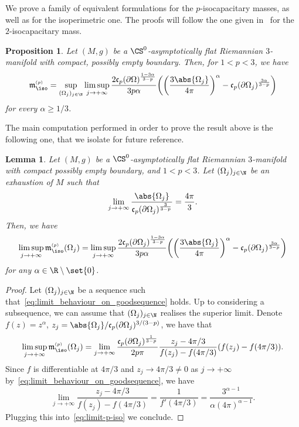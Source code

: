 \documentclass[10pt,a4paper]{amsart}
\numberwithin{equation}{section}
\newtheorem{Lemma}[Theorem]{Lemma}
\newtheorem{Proposition}[Theorem]{Proposition}
\renewcommand{\ncapa}{\mathfrak{c}}
\newcommand{\ma}{\mathfrak{m}}
\newcommand{\tp}[1][p]{{\text{\tiny$(#1)$}}}
\begin{document}
We prove a family of equivalent formulations for the $p$-isocapacitary masses, as well as for the isoperimetric one. The proofs will follow the one given in~\cite[Lemma 10]{jauregui_admmasscapacityvolumedeficit_2020} for the $2$-isocapacitary mass.
\begin{Proposition}\label{prop:equivalence_of_iso_p_mass}
Let $(M,g)$ be a $\CS^0$-asymptotically flat Riemannian $3$-manifold with compact, possibly empty boundary. Then, for $1<p<3$, we have
\begin{equation}\label{eq:equivalence_of_p_masses_for_different_exponents}
 \ma^{\tp}_{\iso}= \sup_{(\Omega_j)_{j \in \N}} \limsup_{j \to +\infty} \frac{2\ncapa_p(\partial \Omega)^{\frac{1-3 \alpha}{3-p}}}{3p\alpha} \bigg( \bigg(\frac{3\abs{ \Omega_j}}{4\pi}\bigg)^{\alpha} - \ncapa_p(\partial \Omega_j)^{\frac{3 \alpha}{3-p}}\bigg)
\end{equation}
for every $\alpha\geq 1/3$.
\end{Proposition}
The main computation performed in order to prove the result above is the following one, that we isolate for future reference.

\begin{Lemma}
 \label{lem:equivalence-specialexhaustion}
 Let $(M,g)$ be a $\CS^0$-asymptotically flat Riemannian $3$-manifold with compact possibly empty boundary, and $1<p<3$. Let $(\Omega_j)_{j \in \N}$ be an exhaustion of $M$ such that
 \begin{equation}
 \label{eq:limit_behaviour_on_goodsequence}
 \lim_{j \to +\infty} \frac{\abs{\Omega_j}}{\ncapa_p(\partial \Omega_j)^{\frac{3}{3-p}}} = \frac{4 \pi }{3}.
\end{equation}
Then, we have
\begin{equation*}
\limsup_{j \to + \infty}\ma^{\tp}_{\iso}(\Omega_j) = \limsup_{j \to +\infty} \frac{2\ncapa_p(\partial \Omega_j)^{\frac{1-3 \alpha}{3-p}}}{3p\alpha} \bigg( \bigg(\frac{3\abs{ \Omega_j}}{4\pi}\bigg)^{\alpha} - \ncapa_p(\partial \Omega_j)^{\frac{3 \alpha}{3-p}}\bigg)
\end{equation*}
for any $\alpha \in \R \setminus \set{0}$.
\end{Lemma}
\begin{proof}
 Let $(\Omega_j)_{j\in \N}$ be a sequence such that~\eqref{eq:limit_behaviour_on_goodsequence} holds. Up to considering a subsequence, we can assume that $(\Omega_j)_{j \in \N}$ realises the superior limit. Denote $f(z)= z^{\alpha}$, $z_j= \abs{\Omega_j}/\ncapa_p(\partial \Omega_j)^{3/(3-p)}$, we have that
\begin{equation}\label{eq:limit-p-iso}
 \limsup_{j \to +\infty} \ma^{\tp}_{\iso}(\Omega_j) = \lim_{j\to +\infty} \frac{\ncapa_p(\partial \Omega_j)^{\frac{1}{3-p}} }{2p \pi } \frac{ z_j - 4 \pi /3 }{f(z_j)- f( 4\pi/3)} (f(z_j) - f( 4 \pi /3)).
\end{equation}
Since $f$ is differentiable at $4\pi/3$ and $z_j\to 4 \pi/3\neq 0$ as $j\to +\infty$ by~\eqref{eq:limit_behaviour_on_goodsequence}, we have
\[
 \lim_{j \to + \infty} \frac{ z_j - 4 \pi /3 }{f(z_j)- f( 4\pi/3)} = \frac{1}{f'(4 \pi /3)}= \frac{3 ^{\alpha-1}}{\alpha(4 \pi )^{\alpha-1}}.
\]
Plugging this into~\eqref{eq:limit-p-iso} we conclude.
\end{proof}
\end{document}
